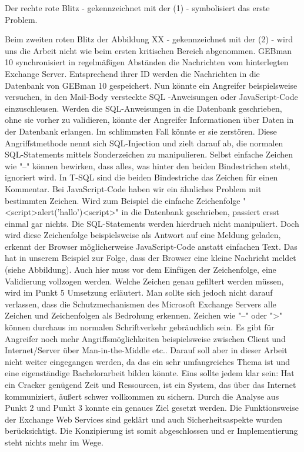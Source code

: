 \noindent
Der rechte rote Blitz - gekennzeichnet mit der (1) - symbolisiert das erste Problem.

\noindent
Beim zweiten roten Blitz der Abbildung XX - gekennzeichnet mit der (2) - wird uns die Arbeit nicht wie beim ersten kritischen Bereich abgenommen. GEBman 10 synchronisiert in regelmäßigen Abständen die Nachrichten vom hinterlegten Exchange Server. Entsprechend ihrer ID werden die Nachrichten in die Datenbank von GEBman 10 gespeichert. Nun könnte ein Angreifer beispielsweise versuchen, in den Mail-Body versteckte SQL -Anweisungen oder JavaScript-Code einzuschleusen. Werden die SQL-Anweisungen in die Datenbank geschrieben, ohne sie vorher zu validieren, könnte der Angreifer Informationen über Daten in der Datenbank erlangen. Im schlimmsten Fall könnte er sie zerstören. Diese Angriffstmethode nennt sich SQL-Injection und zielt darauf ab, die normalen SQL-Statements mittels Sonderzeichen zu manipulieren. Selbst einfache Zeichen wie "--" können bewirken, dass alles, was hinter den beiden Bindestrichen steht, ignoriert wird. In T-SQL sind die beiden Bindestriche das Zeichen für einen Kommentar.
\noindent
Bei JavaScript-Code haben wir ein ähnliches Problem mit bestimmten Zeichen. Wird zum Beispiel die einfache Zeichenfolge "<script>alert('hallo')<script>" in die Datenbank geschrieben, passiert ersst einmal gar nichts. Die SQL-Statements werden hierdruch nicht manipuliert. Doch wird diese Zeichenfolge beispielsweise als Antwort auf eine Meldung geladen, erkennt der Browser möglicherweise JavaScript-Code anstatt einfachen Text. Das hat in unserem Beispiel zur Folge, dass der Browser eine kleine Nachricht meldet (siehe Abbildung).
Auch hier muss vor dem Einfügen der Zeichenfolge, eine Validierung vollzogen werden. Welche Zeichen genau gefiltert werden müssen, wird im Punkt 5 Umsetzung erläutert. Man sollte sich jedoch nicht darauf verlassen, dass die Schutzmechanismen des Microsoft Exchange Servers alle Zeichen und Zeichenfolgen als Bedrohung erkennen. Zeichen wie "--" oder ">" können durchaus im normalen Schriftverkehr gebräuchlich sein.
\noindent
Es gibt für Angreifer noch mehr Angriffsmöglichkeiten beispielsweise zwischen Client und Internet/Server über Man-in-the-Middle etc.. Darauf soll aber in dieser Arbeit nicht weiter eingegangen werden, da das ein sehr umfangreiches Thema ist und eine eigenständige Bachelorarbeit bilden könnte. Eins sollte jedem klar sein: Hat ein Cracker genügend Zeit und Ressourcen, ist ein System, das über das Internet kommuniziert, äußert schwer vollkommen zu sichern. 
\noindent
Durch die Analyse aus Punkt 2 und Punkt 3 konnte ein genaues Ziel gesetzt werden. Die Funktionsweise der Exchange Web Services sind geklärt und auch Sicherheitsaspekte wurden berücksichtigt. Die Konzipierung ist somit abgeschlossen und er Implementierung steht nichts mehr im Wege.
